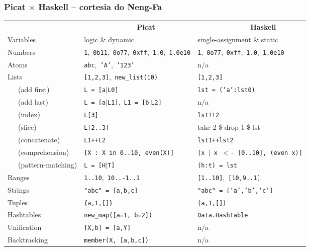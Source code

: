 \begin{frame}[fragile]
	\frametitle{Picat $\times$ Haskell  -- cortesia do Neng-Fa}

\vspace{-0.5 cm}

    \begin{scriptsize}
	\hspace*{-9 mm}\begin{tabular}{|l|l|l|} \cline{1-3}
					& \ \ \ \ \ \ \ \ \ \ \ \ \ \ \ {\bf Picat} &  \ \ \ \ \ \ \ \ \ \ \ \ \ \ \ {\bf Haskell} \\ \cline{1-3}
					Variables & logic \& dynamic & single-assignment \& static \\
					Numbers & \texttt{1},\  \texttt{0b11},\  \texttt{0o77},\  \texttt{0xff},\  \texttt{1.0},\  \texttt{1.0e10} & \texttt{1},\  \texttt{0o77},\  \texttt{0xff},\  \texttt{1.0},\  \texttt{1.0e10}\\
					Atoms   & \texttt{abc},\  \texttt{'A'},\  \texttt{'123'} & n/a \\
					Lists   & \texttt{[1,2,3]},\ \texttt{new\_list(10)} & \texttt{[1,2,3]}\\
					\ \ \ (add first) &  \texttt{L = [a$|$L0]} & \texttt{lst = ('a':lst0)}\\
					\ \ \ (add last) &  \texttt{L = [a$|$L1]},\ \texttt{L1 = [b$|$L2]} & n/a \\
					\ \ \ (index) & \texttt{L[3]}  & \texttt{lst!!2}\\
					\ \ \ (slice) & \texttt{L[2..3]}  & take 2 \$ drop 1 \$ lst \\
					\ \ \ (concatenate) & \texttt{L1++L2}  &  \texttt{lst1++lst2}\\    
					\ \ \ (comprehension) &  \texttt{[X : X in 0..10,\  even(X)]} & \texttt{[x $|$ x $<$- [0..10],\  (even x)]} \\
					\ \ \ (pattern-matching) & \texttt{L = [H$|$T]}  & \texttt{(h:t) = lst}\\
					Ranges  & \texttt{1..10},\ \texttt{10..-1..1} & \texttt{[1..10]},\ \texttt{[10,9..1]} \\
					Strings & \texttt{"abc" = [a,b,c]} & \texttt{"abc" = ['a','b','c']} \\
					Tuples & \texttt{\{a,1,[]\}} & \texttt{(a,1,[])}\\
					Hashtables   & \texttt{new\_map([a=1,\ b=2])} & \texttt{Data.HashTable} \\
					Unification   & \texttt{[X,b] = [a,Y]} & n/a\\
					Backtracking   & \texttt{member(X,\ [a,b,c])} & n/a \\ \cline{1-3}        
				\end{tabular}
			\end{scriptsize}

\end{frame}


